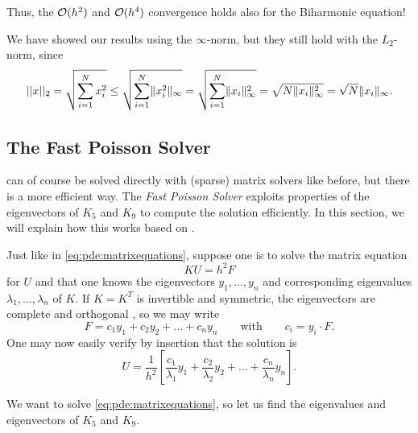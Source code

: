 Thus, the $\mathcal{O}(h^2)$ and $\mathcal{O}(h^4)$ convergence holds also for the Biharmonic equation!

We have showed our results using the $\infty$-norm, but they still hold with the $L_2$-norm, since
\begin{equation*}
	\lvert \lvert x \rvert \rvert_2 =    \sqrt{\sum_{i=1}^N x_i^2 }
	                  \leq \sqrt{\sum_{i=1}^N \lVert x_i^2 \rVert_\infty}
	                  =    \sqrt{\sum_{i=1}^N \lVert x_i \rVert_\infty^2}
	                  =    \sqrt{N            \lVert x_i \rVert_\infty^2}
	                  =    \sqrt{N}           \lVert x_i \rVert_\infty.
\end{equation*}


\subsection{The Fast Poisson Solver}
 can of course be solved directly with (sparse) matrix solvers like before, but there is a more efficient way.
The \emph{Fast Poisson Solver} exploits properties of the eigenvectors of $K_5$ and $K_9$ to compute the solution efficiently.
In this section, we will explain how this works based on \cite{Strang_2012}.

Just like in \cref{eq:pde:matrixequations}, suppose one is to solve the matrix equation 
$$
K U = h^2 F
$$
for $U$ and that one knows the eigenvectors $y_1, \dots, y_n$ and corresponding eigenvalues $\lambda_1, \dots, \lambda_n$ of $K$.
If $K = K^T$ is invertible and symmetric, the eigenvectors are complete and orthogonal \cite{owren}, so we may write
\begin{equation}
F = c_1 y_1 + c_2 y_2 + \dots + c_n y_n
\qquad \text{with} \qquad
c_i = y_i \cdot F.
\label{eq:pde:fexpansion}
\end{equation}
One may now easily verify by insertion that the solution is
\begin{equation}
U =
\frac{1}{h^2} \left[
	\frac{c_1}{\lambda_1} y_1
	+ \frac{c_2}{\lambda_2} y_2
	+ \dots
	+ \frac{c_n}{\lambda_n} y_n
\right].
\label{eq:pde:insertionsolution}
\end{equation}

We want to solve \cref{eq:pde:matrixequations}, so let us find the eigenvalues and eigenvectors of $K_5$ and $K_9$.
\newcommand{\kroeneckerlemmatext}[2]{
	Let $\alpha_1, \dots, \alpha_m$ be eigenvalues of $A$ with corresponding eigenvectors $x_1, \dots, x_m$.
	Let $\beta_1, \dots, \beta_n$ be eigenvalues of $B$ with corresponding eigenvectors $y_1, \dots, y_n$.
	Then $\alpha_m #2 \beta_n$ are eigenvalues of $A #1 B$ with corresponding eigenvectors $x_m \otimes y_n$.
	In other words,
	\begin{equation*}
		A x_m = \alpha_m x_m
		\quad \text{and} \quad
		B y_n = \beta_n y_n
		\quad \implies \quad
		(A #1 B) (x_m \otimes y_n) = (\alpha_m #2 \beta_n) (x_m \otimes y_n)
		.
	\end{equation*}
}

